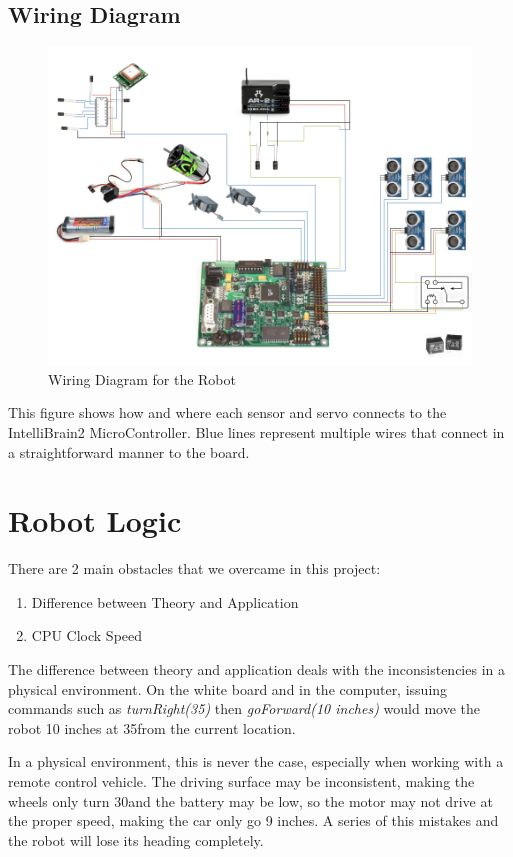 \documentclass[12pt]{article}
\begin{document}
\clearpage
\subsection{Wiring Diagram}
\begin{figure}[h]
\centerline{\includegraphics[scale=.66, angle=90]{img/ckt_layout}}
\caption{Wiring Diagram for the Robot}
\end{figure}

This figure shows how and where each sensor and servo connects to the IntelliBrain2 MicroController.  Blue lines represent multiple wires that connect in a straightforward manner to the board.
\clearpage
\section{Robot Logic}
There are 2 main obstacles that we overcame in this project:
\begin{enumerate}
\item Difference between Theory and Application
\item CPU Clock Speed
\end{enumerate}
The difference between theory and application deals with the inconsistencies in a physical environment.  On the white board and in the computer, issuing commands such as \textit{turnRight(35\textdegree)} then \textit{goForward(10 inches)} would move the robot 10 inches at 35\textdegree from the current location.  

In a physical environment, this is never the case, especially when working with a remote control vehicle.  The driving surface may be inconsistent, making the wheels only turn 30\textdegree and the battery may be low, so the motor may not drive at the proper speed, making the car only go 9 inches.  A series of this mistakes and the robot will lose its heading completely.  
\end{document}
